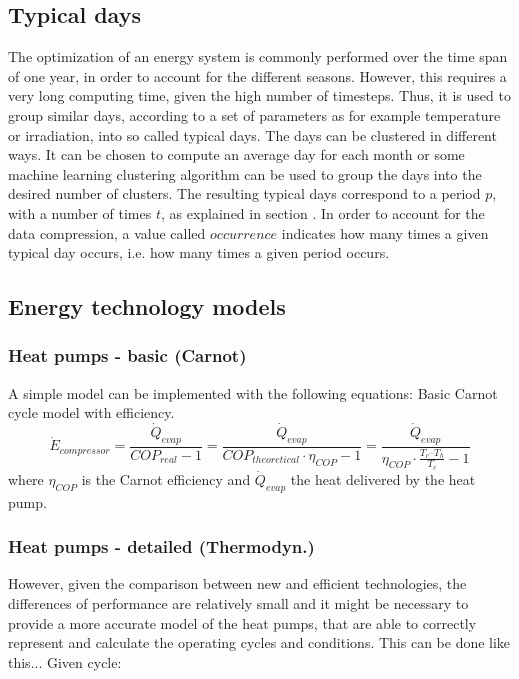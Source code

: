 \documentclass{article}
\begin{document}
\subsection{Typical days}
The optimization of an energy system is commonly performed over the time span of one year, in order to account for the different seasons. However, this requires a very long computing time, given the high number of timesteps. Thus, it is used to group similar days, according to a set of parameters as for example temperature or irradiation, into so called typical days. The days can be clustered in different ways. It can be chosen to compute an average day for each month or some machine learning clustering algorithm can be used to group the days into the desired number of clusters.
The resulting typical days correspond to a period $p$, with a number of times $t$, as explained in section . In order to account for the data compression, a value called $occurrence$ indicates how many times a given typical day occurs, i.e. how many times a given period occurs.

\subsection{Energy technology models}\label{ss:et}

\subsubsection{Heat pumps - basic (Carnot)}\label{sss:hp_carnot}
A simple model can be implemented with the following equations:
Basic Carnot cycle model with efficiency.
\begin{equation}
    \dot{E}_{compressor} = \frac{\dot{Q}_{evap}}{COP_{real}-1} = \frac{\dot{Q}_{evap}}{COP_{theoretical} \cdot \eta_{COP} - 1} = \frac{\dot{Q}_{evap}}{\eta_{COP} \cdot \frac{T_{c} – T_{h}}{T_{c}} -1} 
\end{equation}
where $\eta_{COP}$ is the Carnot efficiency and $\dot{Q}_{evap}$ the heat delivered by the heat pump. \\

\subsubsection{Heat pumps - detailed (Thermodyn.)}\label{sss:hp_thermo}
However, given the comparison between new and efficient technologies, the differences of performance are relatively small and it might be necessary to provide a more accurate model of the heat pumps, that are able to correctly represent and calculate the operating cycles and conditions. This can be done like this...
Given cycle:
\end{document}

